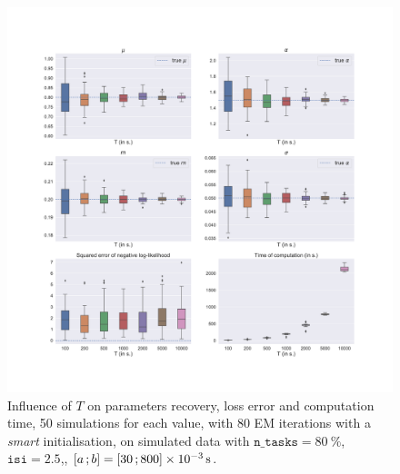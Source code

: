 \begin{figure}[h!]
    \centerfloat
    \includegraphics[width=1.28\textwidth]{pics/results/influence_of_T.pdf}
    \caption{Influence of $T$ on parameters recovery, loss error and computation time, 50 simulations for each value, with 80 EM iterations with a \textit{smart} initialisation, on simulated data with $\texttt{n\_tasks} = \SI{80}{\percent}$, $\texttt{isi}=2.5$,, $\left[ a \, ; b \right] = \left[ 30 \, ; 800 \right]\times \SI{e-3}{\second}$.}
    \label{fig:influence_of_T}
\end{figure}

